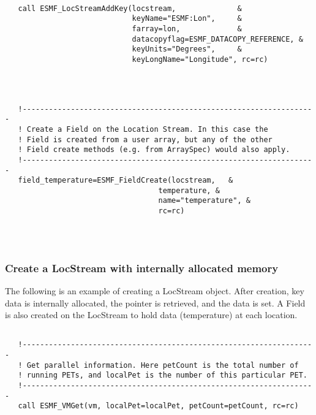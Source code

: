 
 \begin{verbatim}

   call ESMF_LocStreamAddKey(locstream,              &
                             keyName="ESMF:Lon",     &
                             farray=lon,             &
                             datacopyflag=ESMF_DATACOPY_REFERENCE, &
                             keyUnits="Degrees",     &
                             keyLongName="Longitude", rc=rc)

 
\end{verbatim}
 

 \begin{verbatim}

   !-------------------------------------------------------------------
   ! Create a Field on the Location Stream. In this case the 
   ! Field is created from a user array, but any of the other
   ! Field create methods (e.g. from ArraySpec) would also apply.
   !-------------------------------------------------------------------       
   field_temperature=ESMF_FieldCreate(locstream,   &
                                   temperature, &
                                   name="temperature", &
                                   rc=rc)


 
\end{verbatim}
 

  \subsubsection{Create a LocStream with internally allocated memory}
  
   The following is an example of creating a LocStream object.
   After creation, key data is internally allocated,
   the pointer is retrieved, and the data is set.
   A Field is also created on the LocStream to hold data
   (temperature) at each location. 
   

 \begin{verbatim}

   !-------------------------------------------------------------------
   ! Get parallel information. Here petCount is the total number of 
   ! running PETs, and localPet is the number of this particular PET.
   !-------------------------------------------------------------------
   call ESMF_VMGet(vm, localPet=localPet, petCount=petCount, rc=rc)

 
\end{verbatim}
 
